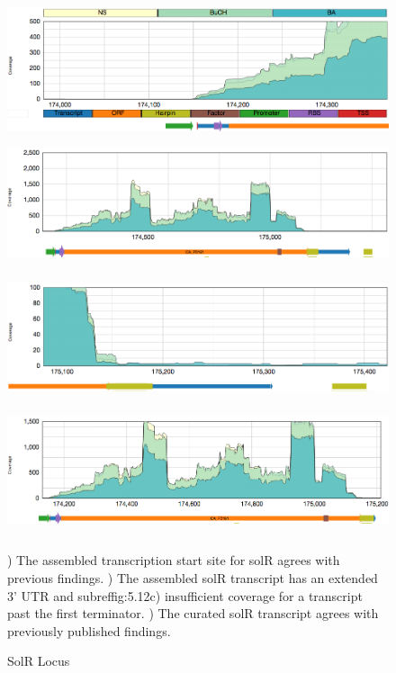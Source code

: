 \begin{figure}
{\includegraphics[width=\textwidth,height=1.5in]{images/Assembly/Examples/Sol/SolR-TSS.png}
\label{fig:5.12a}}
{\includegraphics[width=\textwidth,height=1.5in]{images/Assembly/Examples/Sol/SolR-transcript.png}
\label{fig:5.12b}}
{\includegraphics[width=\textwidth,height=1.5in]{images/Assembly/Examples/Sol/SolR-termination.png}
\label{fig:5.12c}}
{\includegraphics[width=\textwidth,height=1.5in]{images/Assembly/Examples/Sol/SolR-curated.png}
\label{fig:5.12d}}
\caption{SolR Locus}
) The assembled transcription start site for solR agrees with previous findings. ) The assembled solR transcript has an extended 3' UTR and subref{fig:5.12c}) insufficient coverage for a transcript past the first terminator. ) The curated solR transcript agrees with previously published findings\cite{69}.
\end{figure}

